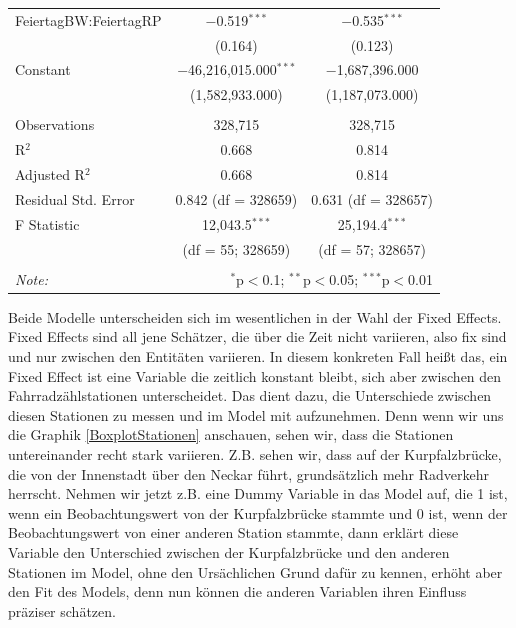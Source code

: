 \documentclass[a4paper,12pt]{thesis}
\begin{document}
\begin{longtable}{@{\extracolsep{-5pt}}lcc}
		FeiertagBW:FeiertagRP & $-$0.519$^{***}$ & $-$0.535$^{***}$ \\ 
		& (0.164) & (0.123) \\ 
		Constant & $-$46,216,015.000$^{***}$ & $-$1,687,396.000 \\ 
		& (1,582,933.000) & (1,187,073.000) \\ 
		\hline \\[-1.8ex] 
		Observations & 328,715 & 328,715 \\ 
		R$^{2}$ & 0.668 & 0.814 \\ 
		Adjusted R$^{2}$ & 0.668 & 0.814 \\ 
		Residual Std. Error & 0.842 (df = 328659) & 0.631 (df = 328657) \\ 
		F Statistic & 12,043.5$^{***}$  & 25,194.4$^{***}$ \\ 
		&(df = 55; 328659)& (df = 57; 328657)\\
		\hline 
		\hline \\[-1.8ex] 
		\textit{Note:}  & \multicolumn{2}{r}{$^{*}$p$<$0.1; $^{**}$p$<$0.05; $^{***}$p$<$0.01} \\ 
	\end{longtable}

Beide Modelle unterscheiden sich im wesentlichen in der Wahl der Fixed Effects. Fixed Effects sind all jene Schätzer, die über die Zeit nicht variieren, also fix sind und nur zwischen den Entitäten variieren. In diesem konkreten Fall heißt das, ein Fixed Effect ist eine Variable die zeitlich konstant bleibt, sich aber zwischen den Fahrradzählstationen unterscheidet. Das dient dazu, die Unterschiede zwischen diesen Stationen zu messen und im Model mit aufzunehmen. Denn wenn wir uns die Graphik \ref{BoxplotStationen} anschauen, sehen wir, dass die Stationen untereinander recht stark variieren. Z.B. sehen wir, dass auf der Kurpfalzbrücke, die von der Innenstadt über den Neckar führt, grundsätzlich mehr Radverkehr herrscht. Nehmen wir jetzt z.B. eine Dummy Variable in das Model auf, die 1 ist, wenn ein Beobachtungswert von der Kurpfalzbrücke stammte und 0 ist, wenn der Beobachtungswert von einer anderen Station stammte, dann erklärt diese Variable den Unterschied zwischen der Kurpfalzbrücke und den anderen Stationen im Model, ohne den Ursächlichen Grund dafür zu kennen, erhöht aber den Fit des Models, denn nun können die anderen Variablen ihren Einfluss präziser schätzen.\\ 
\end{document}
